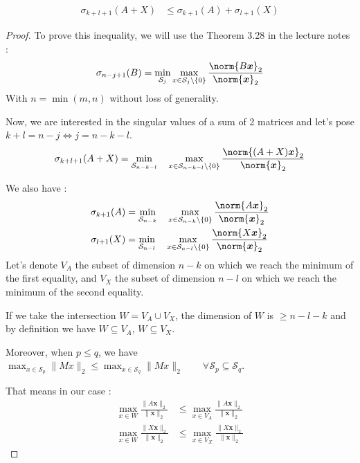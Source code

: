 \documentclass[11pt]{article}
\newcommand{\snorm}[1]{\norm{#1}_2} %
\begin{document}
\begin{align}
\sigma_{k+l + 1}(A+X)
&\leq \sigma_{k+1}(A) + \sigma_{l+1}(X)
\end{align}
\begin{proof}

To prove this inequality, we will use the Theorem 3.28 in the lecture notes :
\[\sigma_{n - j + 1}(B) = \min_{\mathcal{S}_j} \max_{x \in \mathcal{S}_j \setminus \{0\}} \frac{\snorm{B\bm{x}}}{\snorm{\bm{x}}}
\]
With $n =\min(m, n)$ without loss of generality.

Now, we are interested in the singular values of a sum of 2 matrices and let's pose $k+l = n-j \Leftrightarrow j = n-k-l$.
\[\sigma_{k+l + 1}(A+X) = \min_{\mathcal{S}_{n-k-l}} \quad \max_{x \in \mathcal{S}_{n-k-l} \setminus \{0\}} \frac{\snorm{(A+X)\bm{x}}}{\snorm{\bm{x}}}
\]

We also have :
\begin{align*}
\sigma_{k+1}(A) &= \min_{\mathcal{S}_{n-k}} \quad \max_{x\in \mathcal{S}_{n-k}\setminus\{0\}}\frac{\snorm{A\bm{x}}}{\snorm{\bm{x}}}\\
\sigma_{l+1}(X) &= \min_{\mathcal{S}_{n-l}} \quad \max_{x\in \mathcal{S}_{n-l}\setminus\{0\}}\frac{\snorm{X\bm{x}}}{\snorm{\bm{x}}}
\end{align*}
Let's denote $V_A$ the subset of dimension $n-k$ on which we reach the minimum of the first equality, and $V_X$ the subset of dimension $n-l$ on which we reach the minimum of the second equality.

If we take the intersection $W = V_A \cup V_X$, the dimension of $W$ is $\geq n-l-k$ and by definition we have $W \subseteq V_A$, $W \subseteq V_X$. 

Moreover, when $p\leq q$, we have $\max_{x \in \mathcal{S}_p}\|Mx\|_2 \leq \max_{x \in \mathcal{S}_q}\|Mx\|_2 \qquad \forall \mathcal{S}_p \subseteq \mathcal{S}_q$.

That means in our case :
\begin{align*}
\max_{x \in W}\frac{\|A\bm{x}\|_2}{\|\bm{x}\|_2} &\leq \max_{x \in V_A}\frac{\|A\bm{x}\|_2}{\|\bm{x}\|_2}\\
\max_{x \in W}\frac{\|X\bm{x}\|_2}{\|\bm{x}\|_2} &\leq \max_{x \in V_X}\frac{\|X\bm{x}\|_2}{\|\bm{x}\|_2}
\end{align*}


\end{proof}
\end{document}
